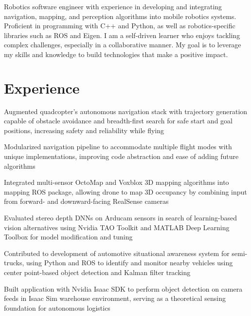 \documentclass{resume}
\begin{document}


\begin{personalstatement}
    Robotics software engineer with experience in developing and integrating navigation, mapping, and perception algorithms into mobile robotics systems. Proficient in programming with C++ and Python, as well as robotics-specific libraries such as ROS and Eigen. I am a self-driven learner who enjoys tackling complex challenges, especially in a collaborative manner. My goal is to leverage my skills and knowledge to build technologies that make a positive impact.
\end{personalstatement}
    
\section{Experience}

\begin{details}
    \item Augmented quadcopter’s autonomous navigation stack with trajectory generation capable of obstacle avoidance and breadth-first search for safe start and goal positions, increasing safety and reliability while flying
    \item Modularized navigation pipeline to accommodate multiple flight modes with unique implementations, improving code abstraction and ease of adding future algorithms
    \item Integrated multi-sensor OctoMap and Voxblox 3D mapping algorithms into mapping ROS package, allowing drone to map 3D occupancy by combining input from forward- and downward-facing RealSense cameras
    \item Evaluated stereo depth DNNs on Arducam sensors in search of learning-based vision alternatives using Nvidia TAO Toolkit and MATLAB Deep Learning Toolbox for model modification and tuning
\end{details}

\begin{details}
    \item Contributed to development of automotive situational awareness system for semi-trucks, using Python and ROS to identify and monitor nearby vehicles using center point-based object detection and Kalman filter tracking
    \item Built application with Nvidia Isaac SDK to perform object detection on camera feeds in Isaac Sim warehouse environment, serving as a theoretical sensing foundation for autonomous logistics
\end{details}
\end{document}
